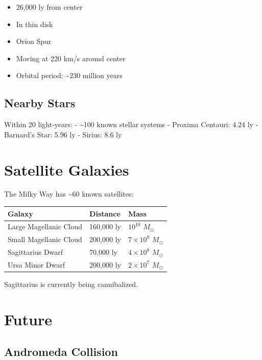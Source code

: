\documentclass[
  11pt,
  letterpaper,
  twoside,
  openright]{book}
\providecommand{\tightlist}{%
  \setlength{\itemsep}{0pt}\setlength{\parskip}{0pt}}
\begin{document}
\begin{itemize}
\tightlist
\item
  26,000 ly from center
\item
  In thin disk
\item
  Orion Spur
\item
  Moving at 220 km/s around center
\item
  Orbital period: \textasciitilde230 million years
\end{itemize}

\subsection{Nearby Stars}\label{nearby-stars}

Within 20 light-years: - \textasciitilde100 known stellar systems -
Proxima Centauri: 4.24 ly - Barnard's Star: 5.96 ly - Sirius: 8.6 ly

\section{Satellite Galaxies}\label{satellite-galaxies}

The Milky Way has \textasciitilde60 known satellites:

\begin{longtable}[]{@{}lll@{}}
\toprule\noalign{}
Galaxy & Distance & Mass \\
\midrule\noalign{}
\endhead
\bottomrule\noalign{}
\endlastfoot
Large Magellanic Cloud & 160,000 ly & \(10^{10}\) \(M_\odot\) \\
Small Magellanic Cloud & 200,000 ly & \(7 \times 10^9\) \(M_\odot\) \\
Sagittarius Dwarf & 70,000 ly & \(4 \times 10^8\) \(M_\odot\) \\
Ursa Minor Dwarf & 200,000 ly & \(2 \times 10^7\) \(M_\odot\) \\
\end{longtable}

Sagittarius is currently being cannibalized.

\section{Future}\label{future}

\subsection{Andromeda Collision}\label{andromeda-collision}
\end{document}
